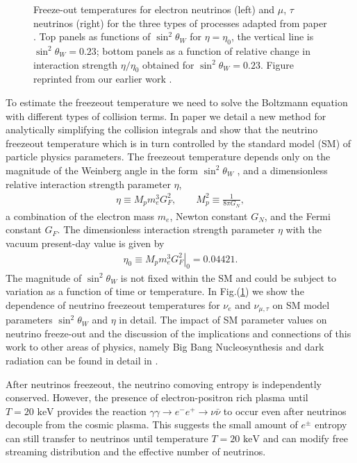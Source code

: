 \documentclass[universe,article,submit,moreauthors,pdftex,a4paper]{Definitions/mdpi}
\newcommand{\keV}{\text{ keV}}
\begin{document}
\begin{figure}[h]
\caption{Freeze-out temperatures for electron neutrinos (left) and $\mu$, $\tau$ neutrinos (right) for the three types of processes adapted from paper \cite{Birrell:2014uka}. Top panels as functions of $\sin^2\theta_W$ for $\eta=\eta_0$, the vertical line is $\sin^2\theta_W=0.23$; bottom panels  as a function  of relative change in interaction strength $\eta/\eta_0$ obtained  for $\sin^2\theta_W=0.23$. Figure reprinted from our earlier work \cite{Birrell:2014uka}.}
\label{fig:freezeoutT}%
 \end{figure}

 To estimate the freezeout temperature we need to solve the Boltzmann equation with different types of collision terms. In paper \cite{Birrell:2014uka} we detail a new method for analytically simplifying the collision integrals and show that the neutrino freezeout temperature which is in turn controlled by the standard model (SM) of particle physics  parameters. The freezeout temperature depends only on the magnitude of the Weinberg angle in the form $\sin^2\theta_W$ , and a dimensionless relative interaction strength parameter $\eta$,
\begin{align}
\eta\equiv M_p m_e^3 G_F^2, \qquad M_p^2\equiv \frac{1}{8\pi G_N}, \end{align}
a combination of  the electron mass $m_e$, Newton constant $G_N$, and the Fermi constant $G_F$. The dimensionless interaction strength parameter $\eta$ with the vacuum present-day value is given by
\begin{align}
\eta_0\equiv \left.M_p m_e^3 G_F^2\right|_0  = 0.04421 .
\end{align}
The magnitude of  $\sin^2\theta_W$ is not fixed within the SM and  could be subject to variation as a function of time or temperature. In Fig.(\ref{fig:freezeoutT}) we show the dependence of neutrino freezeout temperatures for $\nu_e$ and $\nu_{\mu,\tau}$ on SM model parameters  $\sin^2\theta_W$ and $\eta$ in detail. The impact of SM parameter values on neutrino freeze-out and the discussion of the implications and connections of this work to other areas of physics, namely Big Bang Nucleosynthesis and dark radiation can be found in detail in \cite{Birrell:2014uka}.


 After neutrinos freezeout, the neutrino comoving entropy is independently conserved. However, the presence of electron-positron rich plasma until $T=20\keV$ provides the reaction $\gamma\gamma\to e^-e^+\to\nu\bar{\nu}$ to occur even after neutrinos decouple from the cosmic plasma. This suggests the small amount of $e^\pm$ entropy can still transfer to neutrinos until temperature $T=20\keV$ and can modify free streaming distribution and the effective number of neutrinos.
\end{document}
